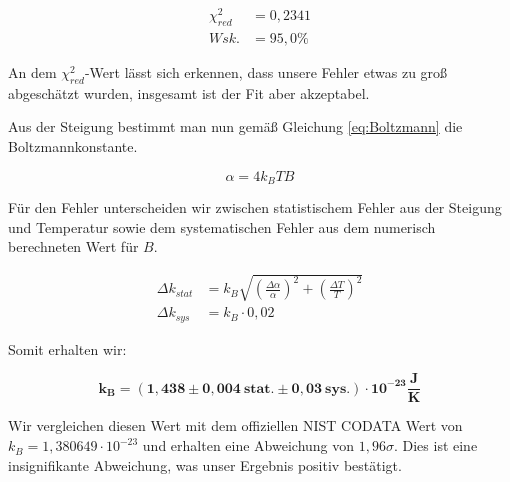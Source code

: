 \documentclass{article}
\begin{document}
\begin{equation}
    \begin{split}
        \chi^2_{red} &= 0,2341 \\
        Wsk. &= 95,0\%
    \end{split}
\end{equation}

An dem $\chi^2_{red}$-Wert lässt sich erkennen, dass unsere Fehler etwas zu groß abgeschätzt wurden, insgesamt ist der Fit aber akzeptabel. 

Aus der Steigung bestimmt man nun gemäß Gleichung \ref{eq:Boltzmann} die Boltzmannkonstante. 

\begin{equation}
    \alpha = 4 k_B T B
\end{equation}

Für den Fehler unterscheiden wir zwischen statistischem Fehler aus der Steigung und Temperatur sowie dem systematischen Fehler aus dem numerisch berechneten Wert für $B$. 

\begin{equation}
    \begin{split}
        \Delta k_{stat} &= k_B \sqrt{\left( \frac{\Delta \alpha}{\alpha}\right)^2 + \left( \frac{\Delta T}{T}\right)^2} \\
        \Delta k_{sys} &= k_B \cdot 0,02
    \end{split}
\end{equation}

Somit erhalten wir:

\begin{equation}
    \bm{k_B = (1,438 \pm 0,004 \ \textbf{stat.} \pm 0,03 \ \textbf{sys.}) \cdot 10^{-23}} \frac{\textbf{J}}{\textbf{K}}
\end{equation}

Wir vergleichen diesen Wert mit dem offiziellen NIST CODATA Wert von $k_B = 1,380649 \cdot 10^{-23}$ und erhalten eine Abweichung von $1,96 \sigma$. Dies ist eine insignifikante Abweichung, was unser Ergebnis positiv bestätigt.

\phantom{.}
\end{document}
